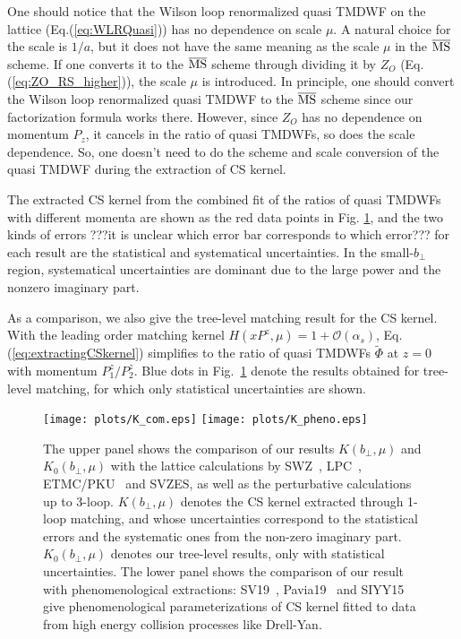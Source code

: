 \documentclass[prd,aps,twocolumn,preprintnumbers, showpacs, nofootinbib,superscriptaddress,notitlepage]{revtex4-1}
\newcommand\bl{\color{blue}}
\begin{document}
One should notice that the Wilson loop renormalized quasi TMDWF on {\bl the} lattice (Eq.(\ref{eq:WLRQuasi})) has no dependence on scale $\mu$. A {\bl natural} choice for the scale is $1/a$, but it does not have the same meaning as the scale $\mu$ in {\bl the} $\overline{\rm MS}$ scheme.  If one converts it to {\bl the} $\overline{\rm MS}$ scheme through dividing it by $Z_{O}$ (Eq.(\ref{eq:ZO_RS_higher})), {\bl the} scale $\mu$ is introduced. In principle, one should convert the Wilson loop renormalized quasi TMDWF to {\bl the} $\overline{\rm MS}$ scheme since our factorization formula works {\bl there.} However, since $Z_{O}$ has no dependence on momentum $P_{z}$, it {\bl cancels} in the ratio of quasi TMDWFs, so {\bl does the} scale dependence. {\bl So,} one doesn't need to do the scheme and scale conversion {\bl of} the quasi TMDWF during the extraction of CS kernel.

The extracted CS kernel from the combined fit of the ratios of quasi TMDWFs  with different {\bl momenta} are shown as the red data points in Fig. \ref{fig:K_com}, and the two kinds of errors {\bl ???it is unclear which error bar corresponds to which error???} for each {\bl result} are the statistical and systematical uncertainties. In the small-$b_{\perp}$ region,   systematical  uncertainties are dominant due to the large power {\bl and the} nonzero imaginary part. 

As a comparison, we also give the tree-level matching  result for the CS kernel.  With the leading order matching kernel $H(xP^z,\mu)=1+\mathcal{O}(\alpha_s)$, Eq. (\ref{eq:extractingCSkernel}) {\bl simplifies to} the ratio of quasi TMDWFs $\tilde{\Phi}$ at $z=0$ {\bl with} momentum $P_1^z/P^z_2$. Blue dots in Fig.~\ref{fig:K_com} denote the results obtained {\bl for tree-level matching, for which only} statistical uncertainties are shown. 

\begin{figure}
\centering
\texttt{[image: plots/K\_com.eps]}
\texttt{[image: plots/K\_pheno.eps]}
\caption{{The upper panel shows the comparison of our results $K(b_{\perp},\mu)$ and $K_0(b_{\perp},\mu)$ with the lattice calculations by SWZ~\cite{Shanahan:2021tst}, LPC~\cite{LatticeParton:2020uhz}, ETMC/PKU~\cite{Li:2021wvl} and SVZES\cite{Schlemmer:2021aij}, as well as the perturbative calculations up to 3-loop. $K(b_{\perp},\mu)$ denotes the CS kernel extracted through 1-loop matching, and whose uncertainties correspond to the statistical errors and the systematic ones from the non-zero imaginary part. $K_0(b_{\perp},\mu)$ denotes our tree-level results, only with statistical uncertainties. The lower panel shows the comparison of our result with phenomenological extractions: SV19~\cite{Scimemi:2019cmh}, Pavia19~\cite{Bacchetta:2019sam} and SIYY15~\cite{Sun:2014dqm} give phenomenological parameterizations of CS kernel {\bl fitted to data from} high energy collision processes like Drell-Yan.}}
\label{fig:K_com}
\end{figure}
\end{document}
